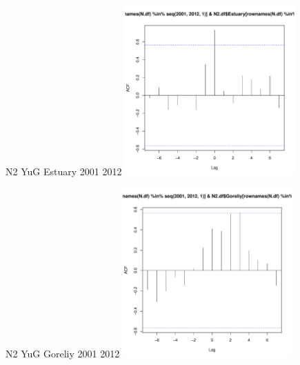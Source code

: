 \documentclass[12pt, a4paper]{disser}
\begin{document}
	\begin{figure}[ht]
	
	\begin{minipage}[b]{.46\linewidth}
	\begin{center}
	{\tiny   N2 YuG Estuary 2001 2012}
		\includegraphics[width=65mm]{../White_Sea/dynamic_N_N1/crosscorr_N2_YuG_Estuary_2001_2012.pdf}

	\end{center}
	\end{minipage}
	\hfil %
	\begin{minipage}[b]{.46\linewidth}
	\begin{center}
	{\tiny  N2 YuG Goreliy 2001 2012}
		\includegraphics[width=65mm]{../White_Sea/dynamic_N_N1/crosscorr_N2_YuG_Goreliy_2001_2012.pdf}
	\end{center}
	\end{minipage}




\end{figure}
\end{document}
